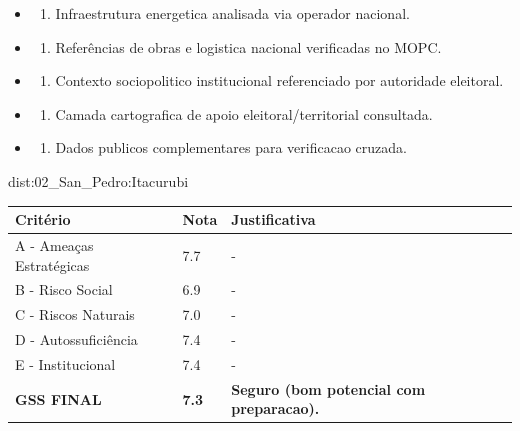 {\begin{itemize}
\item
  \begin{enumerate}
  \def\labelenumi{\arabic{enumi})}
  \setcounter{enumi}{7}
  \tightlist
  \item
    Infraestrutura energetica analisada via operador nacional.
  \end{enumerate}
\item
  \begin{enumerate}
  \def\labelenumi{\arabic{enumi})}
  \setcounter{enumi}{8}
  \tightlist
  \item
    Referências de obras e logistica nacional verificadas no MOPC.
  \end{enumerate}
\item
  \begin{enumerate}
  \def\labelenumi{\arabic{enumi})}
  \setcounter{enumi}{9}
  \tightlist
  \item
    Contexto sociopolitico institucional referenciado por autoridade
    eleitoral.
  \end{enumerate}
\item
  \begin{enumerate}
  \def\labelenumi{\arabic{enumi})}
  \setcounter{enumi}{10}
  \tightlist
  \item
    Camada cartografica de apoio eleitoral/\allowbreak territorial consultada.
  \end{enumerate}
\item
  \begin{enumerate}
  \def\labelenumi{\arabic{enumi})}
  \setcounter{enumi}{11}
  \tightlist
  \item
    Dados publicos complementares para verificacao cruzada.
  \end{enumerate}
\end{itemize}}{dist:02_San_Pedro:Itacurubi}
\begin{table}[ht!]
\small \begin{tabular}{p{3.0cm}p{0.8cm}p{6.0cm}} \toprule
\textbf{Critério} & \textbf{Nota} & \textbf{Justificativa} \\ \midrule
A - Ameaças Estratégicas & 7.7 & - \\
B - Risco Social & 6.9 & - \\
C - Riscos Naturais & 7.0 & - \\
D - Autossuficiência & 7.4 & - \\
E - Institucional & 7.4 & - \\
\midrule \textbf{GSS FINAL} & \textbf{7.3} & \textbf{Seguro (bom potencial com preparacao).} \\ \bottomrule \end{tabular}
\end{table}
